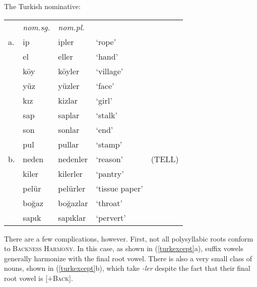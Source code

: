 \begin{example}
\label{turknom}
The Turkish nominative:

\begin{tabular}{l l l l l}
   & \emph{nom.sg.} & \emph{nom.pl.} \\
a. & ip             & ipler          & `rope' & \citep[][216]{Clements1982} \\
   & el             & eller          & `hand'    \\
   & köy            & köyler         & `village' \\
   & yüz            & yüzler         & `face'    \\
   & kız            & kizlar         & `girl'    \\
   & sap            & saplar         & `stalk'   \\
   & son            & sonlar         & `end'     \\
   & pul            & pullar         & `stamp'   \\
b. & neden          & nedenler       & `reason'  & (TELL) \\ %
   & kiler          & kilerler       & `pantry'           \\ %
   & pelür          & pelürler       & `tissue paper'     \\ %
   & boğaz          & boğazlar       & `throat'           \\ %
   & sapık          & sapıklar       & `pervert'          \\ %
\end{tabular}
\end{example}

There are a few complications, however. First, not all polysyllabic roots conform to \textsc{Backness Harmony}. In this case, as shown in (\ref{turkexcept}a), suffix vowels generally harmonize with the final root vowel. There is also a very small class of nouns, shown in (\ref{turkexcept}b), which take \emph{-ler} despite the fact that their final root vowel is [$+$\textsc{Back}].

